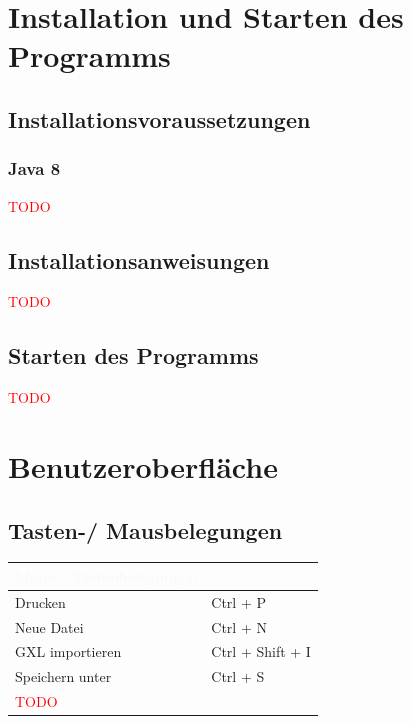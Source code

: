 \documentclass[enabledeprecatedfontcommands,fontsize=11pt,paper=a4,twoside]{scrartcl}
\newcommand*{\red}{\textcolor{red}}
\newcounter{one}
\newcounter{two}[one]
\let\tempone\itemize
\let\temptwo\enditemize
\renewenvironment{itemize}{\tempone\addtolength{\itemsep}{-10.0pt}}{\temptwo}
\begin{document}
\newpage
\section{Installation und Starten des Programms} \label{sec:installation}

\subsection{Installationsvoraussetzungen}
\subsubsection{Java 8}
\red{TODO}

\subsection{Installationsanweisungen}
\begin{itemize}
	\item \red{TODO}
\end{itemize}
\subsection{Starten des Programms}
\red{TODO}

\newpage	
\section{Benutzeroberfläche}
\subsection{Tasten-/ Mausbelegungen}

\begin{tabular} {|p{8cm}|p{8cm}|}
	\hline
	\rowcolor{glaucous}\multicolumn{2}{|l|} {\parbox{16cm}{\textbf{\textcolor{ghostwhite}{Maus-/ Tastenbelegungen}}} } \\ \hline\hline 	
	Drucken	& Ctrl + P \\ \hline
	Neue Datei	& Ctrl + N \\ \hline
	GXL importieren	& Ctrl + Shift + I \\ \hline
	Speichern unter	&	Ctrl + S \\ \hline
	\red{TODO} & \\ \hline
\end{tabular}
\end{document}
